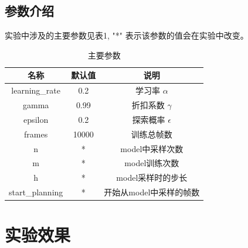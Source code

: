 \documentclass[a4paper,12pt]{article}
\begin{document}
\begin{CJK}{UTF8}{gbsn}
\subsection{参数介绍}
实验中涉及的主要参数见表1, "*" 表示该参数的值会在实验中改变。
\begin{table}[!h]
	\renewcommand{\arraystretch}{1.2}
	\caption{主要参数}
	\centering
	\begin{tabular}{ccc}
		\hline
		名称& 默认值& 说明\\
		\hline
		learning\_rate& 0.2 & 学习率 $\alpha$\\
		gamma& 0.99 & 折扣系数 $\gamma$\\
		epsilon& 0.2 & 探索概率 $\epsilon$ \\
		frames& 10000 & 训练总帧数\\
		n& * & model中采样次数\\
		m& * & model训练次数\\
		h& * & model采样时的步长\\
		start\_planning& * & 开始从model中采样的帧数\\
		\hline
	\end{tabular}
\end{table}
\section{实验效果}

\end{CJK}
\end{document}
